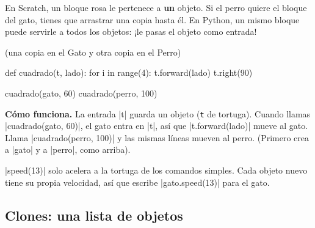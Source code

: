 En Scratch, un bloque rosa le pertenece a \textbf{un} objeto. Si el perro quiere el bloque  del gato, tienes que arrastrar una copia hasta él. En Python, un mismo bloque puede servirle a todos los objetos: ¡le pasas el objeto como entrada!

\begin{tcbraster}[raster columns=2, raster equal height=rows, raster column skip=12pt, raster valign=center, raster force size=false, raster column 1/.style={add to width=-2cm}, raster column 2/.style={add to width=2cm}]
\begin{tcolorbox}[colback=white, colframe=white, boxrule=0pt, valign=center]
\begin{scratch}
\end{scratch}
\par\smallskip
{\small (una copia en el Gato y otra copia en el Perro)}
\end{tcolorbox}
\begin{code}
def cuadrado(t, lado):
    for i in range(4):
        t.forward(lado)
        t.right(90)

cuadrado(gato, 60)
cuadrado(perro, 100)
\end{code}
\end{tcbraster}

\textbf{Cómo funciona.} La entrada \py|t| guarda un objeto (\texttt{t} de tortuga). Cuando llamas \py|cuadrado(gato, 60)|, el gato entra en \py|t|, así que \py|t.forward(lado)| mueve al gato. Llama \py|cuadrado(perro, 100)| y las mismas líneas mueven al perro. (Primero crea a \py|gato| y a \py|perro|, como arriba).

\begin{think}
\py|speed(13)| solo acelera a la tortuga de los comandos simples. Cada objeto nuevo tiene su propia velocidad, así que escribe \py|gato.speed(13)| para el gato.
\end{think}

\subsection*{Clones: una lista de objetos}

